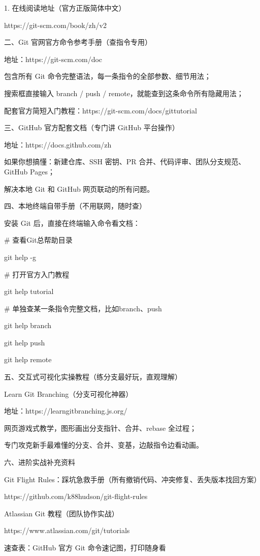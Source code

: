 \documentclass[12pt,a4paper]{article}
\begin{document}
1. 在线阅读地址（官方正版简体中文）

https://git-scm.com/book/zh/v2

二、Git 官网官方命令参考手册（查指令专用）

地址：https://git-scm.com/doc

包含所有 Git 命令完整语法，每一条指令的全部参数、细节用法；

搜索框直接输入 branch / push / remote，就能查到这条命令所有隐藏用法；

配套官方简短入门教程：https://git-scm.com/docs/gittutorial

三、GitHub 官方配套文档（专门讲 GitHub 平台操作）

地址：https://docs.github.com/zh

如果你想搞懂：新建仓库、SSH 密钥、PR 合并、代码评审、团队分支规范、GitHub Pages；

解决本地 Git 和 GitHub 网页联动的所有问题。

四、本地终端自带手册（不用联网，随时查）

安装 Git 后，直接在终端输入命令看文档：

\# 查看Git总帮助目录

git help -g

\# 打开官方入门教程

git help tutorial

\# 单独查某一条指令完整文档，比如branch、push

git help branch

git help push

git help remote

五、交互式可视化实操教程（练分支最好玩，直观理解）

Learn Git Branching（分支可视化神器）

地址：https://learngitbranching.js.org/

网页游戏式教学，图形画出分支指针、合并、rebase 全过程；

专门攻克新手最难懂的分支、合并、变基，边敲指令边看动画。

六、进阶实战补充资料

Git Flight Rules：踩坑急救手册（所有撤销代码、冲突修复、丢失版本找回方案）

https://github.com/k88hudson/git-flight-rules

Atlassian Git 教程（团队协作实战）

https://www.atlassian.com/git/tutorials

速查表：GitHub 官方 Git 命令速记图，打印随身看
\end{document}
